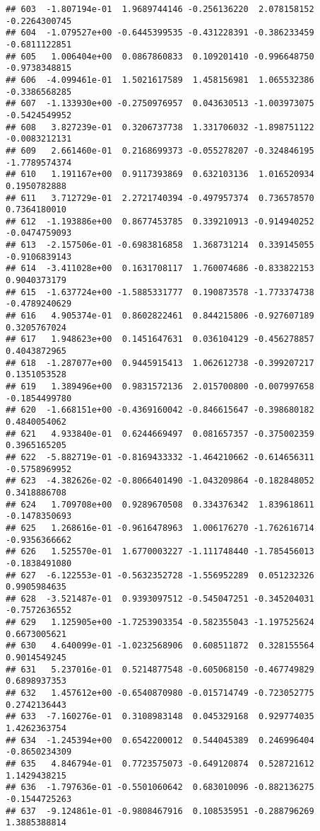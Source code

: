 \documentclass[
]{article}
\begin{document}
\begin{verbatim}
## 603  -1.807194e-01  1.9689744146 -0.256136220  2.078158152 -0.2264300745
## 604  -1.079527e+00 -0.6445399535 -0.431228391 -0.386233459 -0.6811122851
## 605   1.006404e+00  0.0867860833  0.109201410 -0.996648750 -0.9738348815
## 606  -4.099461e-01  1.5021617589  1.458156981  1.065532386 -0.3386568285
## 607  -1.133930e+00 -0.2750976957  0.043630513 -1.003973075 -0.5424549952
## 608   3.827239e-01  0.3206737738  1.331706032 -1.898751122 -0.0083212131
## 609   2.661460e-01  0.2168699373 -0.055278207 -0.324846195 -1.7789574374
## 610   1.191167e+00  0.9117393869  0.632103136  1.016520934  0.1950782888
## 611   3.712729e-01  2.2721740394 -0.497957374  0.736578570  0.7364180010
## 612  -1.193886e+00  0.8677453785  0.339210913 -0.914940252 -0.0474759093
## 613  -2.157506e-01 -0.6983816858  1.368731214  0.339145055 -0.9106839143
## 614  -3.411028e+00  0.1631708117  1.760074686 -0.833822153  0.9040373179
## 615  -1.637724e+00 -1.5885331777  0.190873578 -1.773374738 -0.4789240629
## 616   4.905374e-01  0.8602822461  0.844215806 -0.927607189  0.3205767024
## 617   1.948623e+00  0.1451647631  0.036104129 -0.456278857  0.4043872965
## 618  -1.287077e+00  0.9445915413  1.062612738 -0.399207217  0.1351053528
## 619   1.389496e+00  0.9831572136  2.015700800 -0.007997658 -0.1854499780
## 620  -1.668151e+00 -0.4369160042 -0.846615647 -0.398680182  0.4840054062
## 621   4.933840e-01  0.6244669497  0.081657357 -0.375002359  0.3965165205
## 622  -5.882719e-01 -0.8169433332 -1.464210662 -0.614656311 -0.5758969952
## 623  -4.382626e-02 -0.8066401490 -1.043209864 -0.182848052  0.3418886708
## 624   1.709708e+00  0.9289670508  0.334376342  1.839618611 -0.1478350693
## 625   1.268616e-01 -0.9616478963  1.006176270 -1.762616714 -0.9356366662
## 626   1.525570e-01  1.6770003227 -1.111748440 -1.785456013 -0.1838491080
## 627  -6.122553e-01 -0.5632352728 -1.556952289  0.051232326  0.9905984635
## 628  -3.521487e-01  0.9393097512 -0.545047251 -0.345204031 -0.7572636552
## 629   1.125905e+00 -1.7253903354 -0.582355043 -1.197525624  0.6673005621
## 630   4.640099e-01 -1.0232568906  0.608511872  0.328155564  0.9014549245
## 631   5.237016e-01  0.5214877548 -0.605068150 -0.467749829  0.6898937353
## 632   1.457612e+00 -0.6540870980 -0.015714749 -0.723052775  0.2742136443
## 633  -7.160276e-01  0.3108983148  0.045329168  0.929774035  1.4262363754
## 634  -1.245394e+00  0.6542200012  0.544045389  0.246996404 -0.8650234309
## 635   4.846794e-01  0.7723575073 -0.649120874  0.528721612  1.1429438215
## 636  -1.797636e-01 -0.5501060642  0.683010096 -0.882136275 -0.1544725263
## 637  -9.124861e-01 -0.9808467916  0.108535951 -0.288796269  1.3885388814

\end{verbatim}
\end{document}
